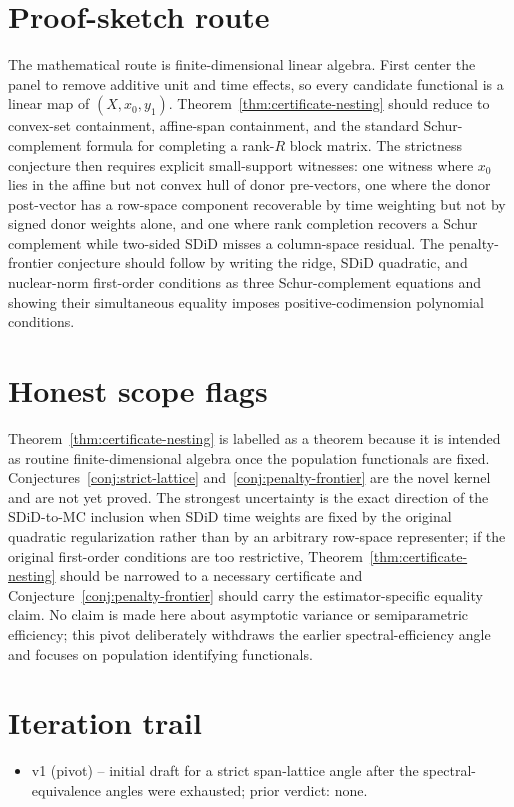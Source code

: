 \documentclass[11pt]{article}
\theoremstyle{definition}
\theoremstyle{plain}
\theoremstyle{remark}
\begin{document}
\section{Proof-sketch route}
The mathematical route is finite-dimensional linear algebra. First center the
panel to remove additive unit and time effects, so every candidate functional
is a linear map of $(X,x_0,y_1)$. Theorem~\ref{thm:certificate-nesting} should
reduce to convex-set containment, affine-span containment, and the standard
Schur-complement formula for completing a rank-$R$ block matrix. The strictness
conjecture then requires explicit small-support witnesses: one witness where
$x_0$ lies in the affine but not convex hull of donor pre-vectors, one where
the donor post-vector has a row-space component recoverable by time weighting
but not by signed donor weights alone, and one where rank completion recovers a
Schur complement while two-sided SDiD misses a column-space residual. The
penalty-frontier conjecture should follow by writing the ridge, SDiD quadratic,
and nuclear-norm first-order conditions as three Schur-complement equations and
showing their simultaneous equality imposes positive-codimension polynomial
conditions.

\section{Honest scope flags}
Theorem~\ref{thm:certificate-nesting} is labelled as a theorem because it is
intended as routine finite-dimensional algebra once the population functionals
are fixed. Conjectures~\ref{conj:strict-lattice} and~\ref{conj:penalty-frontier}
are the novel kernel and are not yet proved. The strongest uncertainty is the
exact direction of the SDiD-to-MC inclusion when SDiD time weights are fixed by
the original quadratic regularization rather than by an arbitrary row-space
representer; if the original first-order conditions are too restrictive,
Theorem~\ref{thm:certificate-nesting} should be narrowed to a necessary
certificate and Conjecture~\ref{conj:penalty-frontier} should carry the
estimator-specific equality claim. No claim is made here about asymptotic
variance or semiparametric efficiency; this pivot deliberately withdraws the
earlier spectral-efficiency angle and focuses on population identifying
functionals.

\section{Iteration trail}
\begin{itemize}[leftmargin=*]
\item v1 (pivot) -- initial draft for a strict span-lattice angle after the
spectral-equivalence angles were exhausted; prior verdict: none.
\end{itemize}
\end{document}
